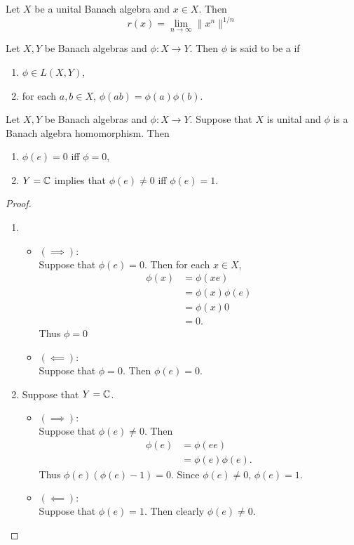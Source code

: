 \documentclass{book}
\begin{document}
	\begin{ex}
		Let $X$ be a unital Banach algebra and $x \in X$. Then 
		$$r(x) = \lim_{n \rightarrow \infty} \|x^n\|^{1/n}$$
	\end{ex}

	\begin{defn}
		Let $X, Y$ be Banach algebras and $\phi: X \rightarrow Y$. Then $\phi$ is said to be a  if 
		\begin{enumerate}
			\item $\phi \in L(X, Y)$,
			\item for each $a, b \in X$, $\phi(ab) = \phi(a) \phi(b)$.
		\end{enumerate}
	\end{defn}

	\begin{ex}
		Let $X, Y$ be Banach algebras and $\phi: X \rightarrow Y$. Suppose that $X$ is unital and $\phi$ is a Banach algebra homomorphism. Then 
		\begin{enumerate}
			\item $\phi(e) = 0$ iff $\phi = 0$,
			\item $Y = \mathbb{C}$ implies that $\phi(e) \neq 0$ iff $\phi(e) = 1$.
		\end{enumerate}
	\end{ex}

	\begin{proof}\
		\begin{enumerate}
			\item 
			\begin{itemize}
				\item $(\implies):$ \\
				Suppose that $\phi(e) = 0$. Then for each $x \in X$, 
				\begin{align*}
					\phi(x)
					& = \phi(x e) \\
					& = \phi(x) \phi(e) \\
					& = \phi(x) 0 \\
					& = 0.
				\end{align*}
				Thus $\phi = 0$
				\item $(\impliedby):$ \\ 
				Suppose that $\phi = 0$. Then $\phi(e) = 0$.
			\end{itemize}
			\item Suppose that $Y = \mathbb{C}$.
			\begin{itemize}
				\item $(\implies):$ \\
				Suppose that $\phi(e) \neq 0$. Then 
				\begin{align*}
					\phi(e)
					& = \phi(e e) \\
					& = \phi(e) \phi(e).
				\end{align*}
				Thus $\phi(e)(\phi(e) - 1) = 0$. Since $\phi(e) \neq 0$, $\phi(e) = 1$.
				\item $(\impliedby):$ \\ 
				Suppose that $\phi(e) = 1$. Then clearly $\phi(e) \neq 0$.
			\end{itemize}
		\end{enumerate}
	\end{proof}
\end{document}
